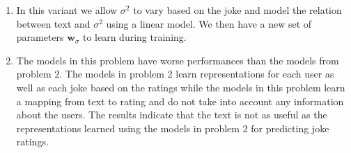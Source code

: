 \documentclass[10pt]{harvardml}
\theoremstyle{plain}
\begin{document}
\begin{enumerate}
\item In this variant we allow $\sigma^2$ to vary based on the joke and model the relation between text and $\sigma^2$ using a linear model. We then have a new set of parameters $\mathbf{w}_{\sigma}$ to learn during training.
\item The models in this problem have worse performances than the models from problem $2$. The models in problem $2$ learn representations for each user as well as each joke based on the ratings while the models in this problem learn a mapping from text to rating and do not take into account any information about the users. The results indicate that the text is not as useful as the representations learned using the models in problem 2 for predicting joke ratings.































\end{enumerate}
\end{document}
